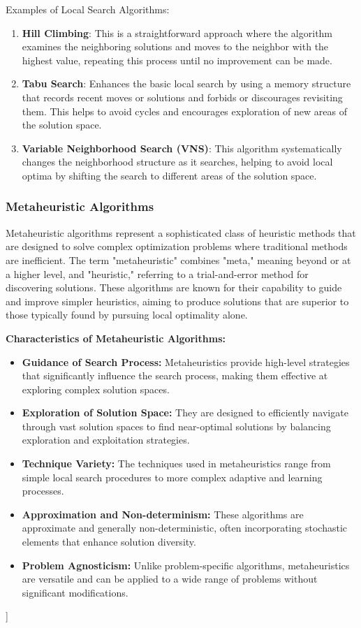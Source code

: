 \documentclass{article}
\begin{document}
    Examples of Local Search Algorithms:
    \begin{enumerate}
        \item \textbf{Hill Climbing}: This is a straightforward approach where the algorithm examines the neighboring solutions and moves to the neighbor with the highest value, repeating this process until no improvement can be made.
        \item \textbf{Tabu Search}: Enhances the basic local search by using a memory structure that records recent moves or solutions and forbids or discourages revisiting them. This helps to avoid cycles and encourages exploration of new areas of the solution space.
        \item \textbf{Variable Neighborhood Search (VNS)}: This algorithm systematically changes the neighborhood structure as it searches, helping to avoid local optima by shifting the search to different areas of the solution space.
    \end{enumerate} \cite[pp. 90--94]{toth2014vehicle}

    \subsubsection{Metaheuristic Algorithms}\label{itm:metaheuristic-algorithms}

    Metaheuristic algorithms represent a sophisticated class of heuristic methods that are designed to solve complex optimization problems where traditional methods are inefficient. The term "metaheuristic" combines "meta," meaning beyond or at a higher level, and "heuristic," referring to a trial-and-error method for discovering solutions. These algorithms are known for their capability to guide and improve simpler heuristics, aiming to produce solutions that are superior to those typically found by pursuing local optimality alone. \cite{kaveh2021}

    \textbf{Characteristics of Metaheuristic Algorithms:}
    \begin{itemize}
        \item \textbf{Guidance of Search Process:} Metaheuristics provide high-level strategies that significantly influence the search process, making them effective at exploring complex solution spaces.
        \item \textbf{Exploration of Solution Space:} They are designed to efficiently navigate through vast solution spaces to find near-optimal solutions by balancing exploration and exploitation strategies.
        \item \textbf{Technique Variety:} The techniques used in metaheuristics range from simple local search procedures to more complex adaptive and learning processes.
        \item \textbf{Approximation and Non-determinism:} These algorithms are approximate and generally non-deterministic, often incorporating stochastic elements that enhance solution diversity.
        \item \textbf{Problem Agnosticism:} Unlike problem-specific algorithms, metaheuristics are versatile and can be applied to a wide range of problems without significant modifications.
    \end{itemize} \cite{kaveh2021}]
\end{document}
